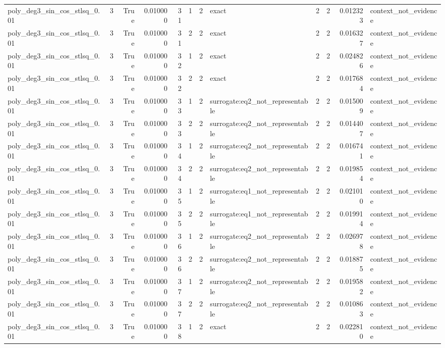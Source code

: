 \begin{tabular}{lrrrrrrlrrrl}
poly\_deg3\_sin\_cos\_stlsq\_0.01 & 3 & True & 0.010000 & 31 & 1 & 2 & exact & 2 & 2 & 0.012323 & context\_not\_evidence \\
poly\_deg3\_sin\_cos\_stlsq\_0.01 & 3 & True & 0.010000 & 31 & 2 & 2 & exact & 2 & 2 & 0.016327 & context\_not\_evidence \\
poly\_deg3\_sin\_cos\_stlsq\_0.01 & 3 & True & 0.010000 & 32 & 1 & 2 & exact & 2 & 2 & 0.024826 & context\_not\_evidence \\
poly\_deg3\_sin\_cos\_stlsq\_0.01 & 3 & True & 0.010000 & 32 & 2 & 2 & exact & 2 & 2 & 0.017684 & context\_not\_evidence \\
poly\_deg3\_sin\_cos\_stlsq\_0.01 & 3 & True & 0.010000 & 33 & 1 & 2 & surrogate:eq2\_not\_representable & 2 & 2 & 0.015009 & context\_not\_evidence \\
poly\_deg3\_sin\_cos\_stlsq\_0.01 & 3 & True & 0.010000 & 33 & 2 & 2 & surrogate:eq2\_not\_representable & 2 & 2 & 0.014407 & context\_not\_evidence \\
poly\_deg3\_sin\_cos\_stlsq\_0.01 & 3 & True & 0.010000 & 34 & 1 & 2 & surrogate:eq2\_not\_representable & 2 & 2 & 0.016741 & context\_not\_evidence \\
poly\_deg3\_sin\_cos\_stlsq\_0.01 & 3 & True & 0.010000 & 34 & 2 & 2 & surrogate:eq2\_not\_representable & 2 & 2 & 0.019854 & context\_not\_evidence \\
poly\_deg3\_sin\_cos\_stlsq\_0.01 & 3 & True & 0.010000 & 35 & 1 & 2 & surrogate:eq1\_not\_representable & 2 & 2 & 0.021010 & context\_not\_evidence \\
poly\_deg3\_sin\_cos\_stlsq\_0.01 & 3 & True & 0.010000 & 35 & 2 & 2 & surrogate:eq1\_not\_representable & 2 & 2 & 0.019914 & context\_not\_evidence \\
poly\_deg3\_sin\_cos\_stlsq\_0.01 & 3 & True & 0.010000 & 36 & 1 & 2 & surrogate:eq2\_not\_representable & 2 & 2 & 0.026978 & context\_not\_evidence \\
poly\_deg3\_sin\_cos\_stlsq\_0.01 & 3 & True & 0.010000 & 36 & 2 & 2 & surrogate:eq2\_not\_representable & 2 & 2 & 0.018875 & context\_not\_evidence \\
poly\_deg3\_sin\_cos\_stlsq\_0.01 & 3 & True & 0.010000 & 37 & 1 & 2 & surrogate:eq2\_not\_representable & 2 & 2 & 0.019582 & context\_not\_evidence \\
poly\_deg3\_sin\_cos\_stlsq\_0.01 & 3 & True & 0.010000 & 37 & 2 & 2 & surrogate:eq2\_not\_representable & 2 & 2 & 0.010863 & context\_not\_evidence \\
poly\_deg3\_sin\_cos\_stlsq\_0.01 & 3 & True & 0.010000 & 38 & 1 & 2 & exact & 2 & 2 & 0.022810 & context\_not\_evidence \\

\end{tabular}

